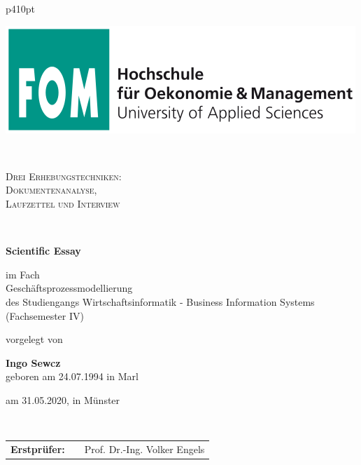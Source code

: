 \begin{center}
\begin{tabular}{p{410pt}}%


\begin{center}
\includegraphics[scale=0.4]{img/fomlogo.png}
\end{center}


\\

\begin{center}
\LARGE{\textsc{
Drei Erhebungstechniken:\\Dokumentenanalyse,\\ Laufzettel und Interview\\
}}
\end{center}

\\

\begin{center}
\textbf{\Large{Scientific Essay}}
\end{center}


\begin{center}
im Fach\\
Geschäftsprozessmodellierung \\
des Studiengangs Wirtschaftsinformatik - Business Information Systems \\
(Fachsemester IV)
\end{center}


\begin{center}
vorgelegt von
\end{center}

\begin{center}
\large{\textbf{Ingo Sewcz}} \\
\small{geboren am 24.07.1994 in Marl}
\end{center}

\begin{center}
\large{am 31.05.2020, in Münster}
\end{center}

\\

\begin{center}
\begin{tabular}{lll}
\textbf{Erstprüfer:} & & Prof. Dr.-Ing. Volker Engels\\
\end{tabular}
\end{center}

\end{tabular}
\end{center}
